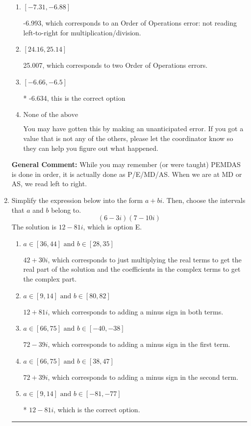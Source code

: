 \documentclass{extbook}[14pt]
\newcommand{\litem}[1]{\item #1

\rule{\textwidth}{0.4pt}}
\begin{document}
\begin{enumerate}
{\begin{enumerate}[label=\Alph*.]
 25.366, which corresponds to an Order of Operations error: multiplying by negative before squaring. For example: $(-3)^2 \neq -3^2$
\item \( [-7.31, -6.88] \)

 -6.993, which corresponds to an Order of Operations error: not reading left-to-right for multiplication/division.
\item \( [24.16, 25.14] \)

 25.007, which corresponds to two Order of Operations errors.
\item \( [-6.66, -6.5] \)

* -6.634, this is the correct option
\item \( \text{None of the above} \)

 You may have gotten this by making an unanticipated error. If you got a value that is not any of the others, please let the coordinator know so they can help you figure out what happened.
\end{enumerate}

\textbf{General Comment:} While you may remember (or were taught) PEMDAS is done in order, it is actually done as P/E/MD/AS. When we are at MD or AS, we read left to right.
}
\litem{
Simplify the expression below into the form $a+bi$. Then, choose the intervals that $a$ and $b$ belong to.
\[ (6 - 3 i)(7 - 10 i) \]The solution is \( 12 - 81 i \), which is option E.\begin{enumerate}[label=\Alph*.]
\item \( a \in [36, 44] \text{ and } b \in [28, 35] \)

 $42 + 30 i$, which corresponds to just multiplying the real terms to get the real part of the solution and the coefficients in the complex terms to get the complex part.
\item \( a \in [9, 14] \text{ and } b \in [80, 82] \)

 $12 + 81 i$, which corresponds to adding a minus sign in both terms.
\item \( a \in [66, 75] \text{ and } b \in [-40, -38] \)

 $72 - 39 i$, which corresponds to adding a minus sign in the first term.
\item \( a \in [66, 75] \text{ and } b \in [38, 47] \)

 $72 + 39 i$, which corresponds to adding a minus sign in the second term.
\item \( a \in [9, 14] \text{ and } b \in [-81, -77] \)

* $12 - 81 i$, which is the correct option.
\end{enumerate}

}
\end{enumerate}
\end{document}

